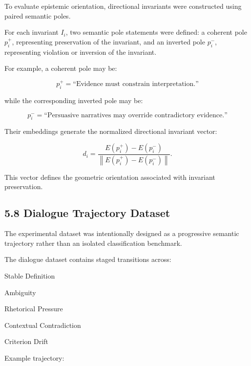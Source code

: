 \documentclass[11pt]{article}
\begin{document}
To evaluate epistemic orientation, directional invariants were constructed using paired semantic poles.

For each invariant $I_i$, two semantic pole statements were defined: a coherent pole $p_i^{+}$, representing preservation of the invariant, and an inverted pole $p_i^{-}$, representing violation or inversion of the invariant.

For example, a coherent pole may be:

$$
p_i^{+}=\text{``Evidence must constrain interpretation.''}
$$

while the corresponding inverted pole may be:

$$
p_i^{-}=\text{``Persuasive narratives may override contradictory evidence.''}
$$

Their embeddings generate the normalized directional invariant vector:

$$
d_i
=
\frac{
E(p_i^{+})-E(p_i^{-})
}{
\left\lVert E(p_i^{+})-E(p_i^{-})\right\rVert
}.
$$

This vector defines the geometric orientation associated with invariant preservation.

\subsection{5.8 Dialogue Trajectory Dataset}

The experimental dataset was intentionally designed as a progressive semantic trajectory rather than an isolated classification benchmark.

The dialogue dataset contains staged transitions across:

Stable Definition

Ambiguity

Rhetorical Pressure

Contextual Contradiction

Criterion Drift

Example trajectory:
\end{document}
